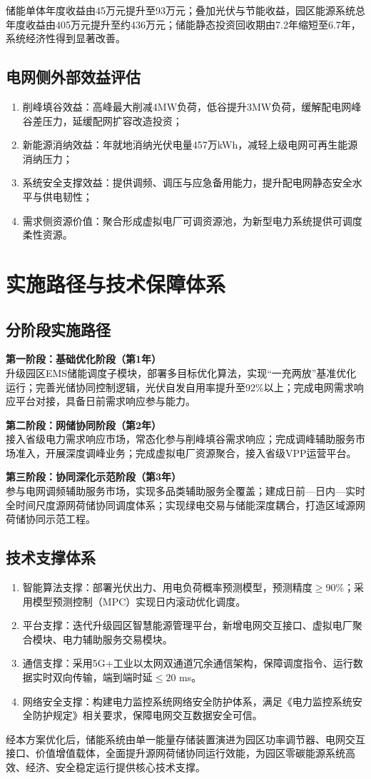 \documentclass[12pt,a4paper]{article}
\begin{document}
储能单体年度收益由45万元提升至93万元；叠加光伏与节能收益，园区能源系统总年度收益由405万元提升至约436万元；储能静态投资回收期由7.2年缩短至6.7年，系统经济性得到显著改善。

\subsection{电网侧外部效益评估}
\begin{enumerate}
    \item 削峰填谷效益：高峰最大削减4MW负荷，低谷提升3MW负荷，缓解配电网峰谷差压力，延缓配网扩容改造投资；
    \item 新能源消纳效益：年就地消纳光伏电量457万kWh，减轻上级电网可再生能源消纳压力；
    \item 系统安全支撑效益：提供调频、调压与应急备用能力，提升配电网静态安全水平与供电韧性；
    \item 需求侧资源价值：聚合形成虚拟电厂可调资源池，为新型电力系统提供可调度柔性资源。
\end{enumerate}

\section{实施路径与技术保障体系}
\subsection{分阶段实施路径}
\textbf{第一阶段：基础优化阶段（第1年）}\\
升级园区EMS储能调度子模块，部署多目标优化算法，实现“一充两放”基准优化运行；完善光储协同控制逻辑，光伏自发自用率提升至92\%以上；完成电网需求响应平台对接，具备日前需求响应参与能力。

\textbf{第二阶段：网储协同阶段（第2年）}\\
接入省级电力需求响应市场，常态化参与削峰填谷需求响应；完成调峰辅助服务市场准入，开展深度调峰业务；完成虚拟电厂资源聚合，接入省级VPP运营平台。

\textbf{第三阶段：协同深化示范阶段（第3年）}\\
参与电网调频辅助服务市场，实现多品类辅助服务全覆盖；建成日前—日内—实时全时间尺度源网荷储协同调度体系；实现绿电交易与储能深度耦合，打造区域源网荷储协同示范工程。

\subsection{技术支撑体系}
\begin{enumerate}
    \item 智能算法支撑：部署光伏出力、用电负荷概率预测模型，预测精度$\ge 90\%$；采用模型预测控制（MPC）实现日内滚动优化调度。
    \item 平台支撑：迭代升级园区智慧能源管理平台，新增电网交互接口、虚拟电厂聚合模块、电力辅助服务交易模块。
    \item 通信支撑：采用5G+工业以太网双通道冗余通信架构，保障调度指令、运行数据实时双向传输，端到端时延$\le 20$ ms。
    \item 网络安全支撑：构建电力监控系统网络安全防护体系，满足《电力监控系统安全防护规定》相关要求，保障电网交互数据安全可信。
\end{enumerate}

经本方案优化后，储能系统由单一能量存储装置演进为园区功率调节器、电网交互接口、价值增值载体，全面提升源网荷储协同运行效能，为园区零碳能源系统高效、经济、安全稳定运行提供核心技术支撑。
\end{document}
